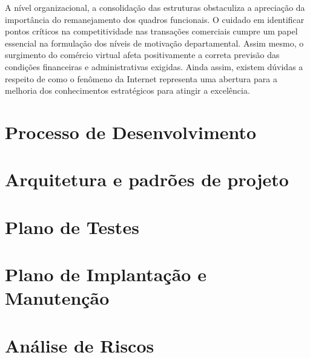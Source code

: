 \documentclass[12pt,a4paper]{report}
\begin{document}
A nível organizacional, a consolidação das estruturas obstaculiza a apreciação da importância do remanejamento dos quadros funcionais. O cuidado em identificar pontos críticos na competitividade nas transações comerciais cumpre um papel essencial na formulação dos níveis de motivação departamental. Assim mesmo, o surgimento do comércio virtual afeta positivamente a correta previsão das condições financeiras e administrativas exigidas. Ainda assim, existem dúvidas a respeito de como o fenômeno da Internet representa uma abertura para a melhoria dos conhecimentos estratégicos para atingir a excelência.

\chapter{Processo de Desenvolvimento}


\chapter{Arquitetura e padrões de projeto}


\chapter{Plano de Testes}

\chapter{Plano de Implantação e Manutenção}

\chapter{Análise de Riscos}
\end{document}
